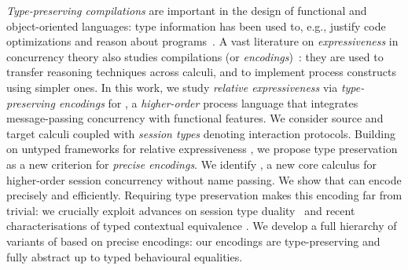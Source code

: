 \documentclass[runningheads]{llncs}
\begin{document}
\emph{Type-preserving compilations} are important in the design of
functional and object-oriented languages: type information has been
used to, e.g., justify code optimizations and reason about programs~\cite{DBLP:journals/toplas/MorrisettWCG99,DBLP:conf/pldi/ShaoA95,DBLP:journals/toplas/LeagueST02}.
A vast literature on 
{\em expressiveness} 
in concurrency theory
also studies compilations (or \emph{encodings})~\cite{Palamidessi03,DBLP:journals/iandc/Gorla10,DBLP:journals/tcs/FuL10,DBLP:conf/icalp/LanesePSS10,DBLP:journals/corr/PetersG15}:
they are used to transfer reasoning techniques 
across calculi,
and to 
implement process constructs using simpler ones.
In this work, we study 
{\em relative expressiveness} 
via \emph{type-preserving encodings} for \HOp, a \emph{higher-order} 
process language that integrates message-passing concurrency with functional features.
We consider source and target calculi coupled with \emph{session types} denoting interaction protocols. 
Building on untyped frameworks for relative expressiveness
\cite{DBLP:journals/iandc/Gorla10}, 
we propose type preservation as a {new criterion} for \emph{precise encodings}.
We identify \HO, a new core calculus for higher-order session concurrency without
name passing. 
We show that \HO can encode \HOp precisely and efficiently. 
Requiring  
type preservation makes
this encoding far from trivial: we crucially exploit advances on
session type duality~\cite{TGC14,DBLP:journals/corr/abs-1202-2086} and recent
characterisations of typed contextual equivalence \cite{characteristic_bis}.
We develop a full hierarchy of variants of \HOp based on 
precise encodings: %
our encodings are
type-preserving and fully abstract up to typed
behavioural equalities. 
\end{document}
